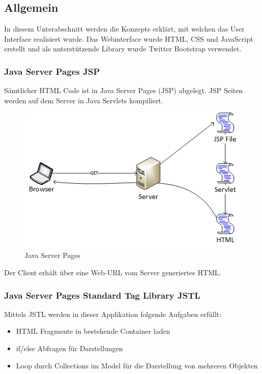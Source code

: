  \newpage

\subsection{Allgemein}
In diesem Unterabschnitt werden die Konzepte erklärt, mit welchen das User Interface realisiert wurde. Das Webinterface wurde HTML, CSS und JavaScript erstellt und als unterstützende Library wurde Twitter Bootstrap verwendet.

\subsubsection{Java Server Pages JSP}
Sämtlicher HTML Code ist in Java Server Pages (JSP) abgelegt. JSP Seiten werden auf dem Server in Java Servlets kompiliert.
\begin{figure}[H]
\centering
\includegraphics[scale=1]{../04_Realisierung/images/userinterface/jsp.png}
\caption{Java Server Pages}
\end{figure}
Der Client erhält über eine Web-URL vom Server generiertes HTML.

\subsubsection{Java Server Pages Standard Tag Library JSTL}
Mittels JSTL werden in dieser Applikation folgende Aufgaben erfüllt:
\begin{itemize}
\item HTML Fragmente in bestehende Container laden
\item if/else Abfragen für Darstellungen
\item Loop durch Collections im Model für die Darstellung von mehreren Objekten
\end{itemize}

